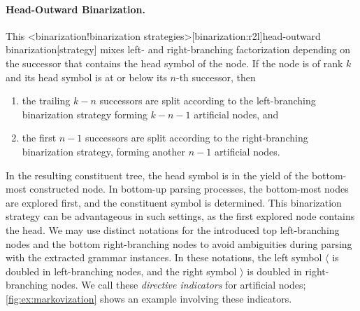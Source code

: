 \documentclass[../../document.tex]{subfiles}
\begin{document}
    \paragraph{Head-Outward Binarization.}
    This <binarization!binarization strategies>[binarization:r2l]{head-outward binarization}[strategy] mixes left- and right-branching factorization depending on the successor that contains the head symbol of the node.
    If the node is of rank \(k\) and its head symbol is at or below its \(n\)-th successor, then
    \begin{enumerate}
        \item the trailing \(k-n\) successors are split according to the left-branching binarization strategy forming \(k-n-1\) artificial nodes, and
        \item the first \(n-1\) successors are split according to the right-branching binarization strategy, forming another \(n-1\) artificial nodes.
    \end{enumerate}
    In the resulting constituent tree, the head symbol is in the yield of the bottom-most constructed node.
    In bottom-up parsing processes, the bottom-most nodes are explored first, and the constituent symbol is determined.
    This binarization strategy can be advantageous in such settings, as the first explored node contains the head.
    We may use distinct notations for the introduced top left-branching nodes and the bottom right-branching nodes to avoid ambiguities during parsing with the extracted grammar instances.
    In these notations, the left symbol \(\langle\) is doubled in left-branching nodes, and the right symbol \(\rangle\) is doubled in right-branching nodes.
    We call these \emph{directive indicators} for artificial nodes; \cref{fig:ex:markovization} shows an example involving these indicators.
\end{document}
